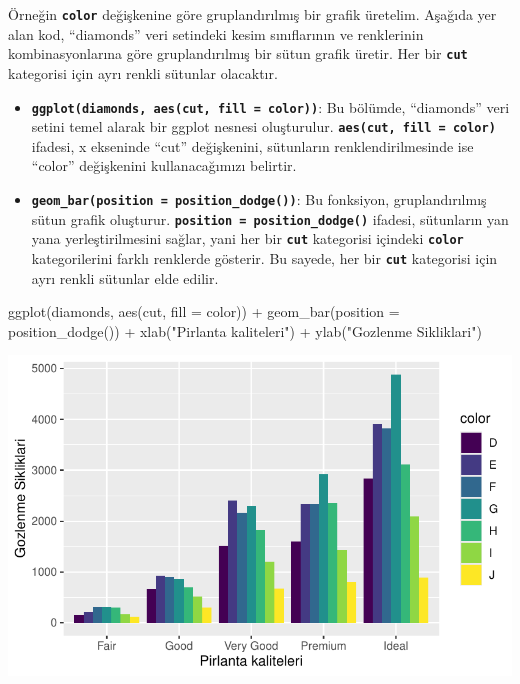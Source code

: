 \documentclass[
  letterpaper,
  DIV=11,
  numbers=noendperiod]{scrreprt}
\newenvironment{Shaded}{\begin{snugshade}}{\end{snugshade}}
\newcommand{\AttributeTok}[1]{\textcolor[rgb]{0.40,0.45,0.13}{#1}}
\newcommand{\FunctionTok}[1]{\textcolor[rgb]{0.28,0.35,0.67}{#1}}
\newcommand{\NormalTok}[1]{\textcolor[rgb]{0.00,0.23,0.31}{#1}}
\newcommand{\SpecialCharTok}[1]{\textcolor[rgb]{0.37,0.37,0.37}{#1}}
\newcommand{\StringTok}[1]{\textcolor[rgb]{0.13,0.47,0.30}{#1}}
\begin{document}
Örneğin \textbf{\texttt{color}} değişkenine göre gruplandırılmış bir
grafik üretelim. Aşağıda yer alan kod, ``diamonds'' veri setindeki kesim
sınıflarının ve renklerinin kombinasyonlarına göre gruplandırılmış bir
sütun grafik üretir. Her bir \textbf{\texttt{cut}} kategorisi için ayrı
renkli sütunlar olacaktır.

\begin{itemize}
\item
  \textbf{\texttt{ggplot(diamonds,\ aes(cut,\ fill\ =\ color))}}: Bu
  bölümde, ``diamonds'' veri setini temel alarak bir ggplot nesnesi
  oluşturulur. \textbf{\texttt{aes(cut,\ fill\ =\ color)}} ifadesi, x
  ekseninde ``cut'' değişkenini, sütunların renklendirilmesinde ise
  ``color'' değişkenini kullanacağımızı belirtir.
\item
  \textbf{\texttt{geom\_bar(position\ =\ position\_dodge())}}: Bu
  fonksiyon, gruplandırılmış sütun grafik oluşturur.
  \textbf{\texttt{position\ =\ position\_dodge()}} ifadesi, sütunların
  yan yana yerleştirilmesini sağlar, yani her bir \textbf{\texttt{cut}}
  kategorisi içindeki \textbf{\texttt{color}} kategorilerini farklı
  renklerde gösterir. Bu sayede, her bir \textbf{\texttt{cut}}
  kategorisi için ayrı renkli sütunlar elde edilir.
\end{itemize}

\begin{Shaded}
\begin{Highlighting}[]
\FunctionTok{ggplot}\NormalTok{(diamonds, }\FunctionTok{aes}\NormalTok{(cut, }\AttributeTok{fill =}\NormalTok{ color)) }\SpecialCharTok{+}
  \FunctionTok{geom\_bar}\NormalTok{(}\AttributeTok{position =} \FunctionTok{position\_dodge}\NormalTok{()) }\SpecialCharTok{+} 
  \FunctionTok{xlab}\NormalTok{(}\StringTok{"Pirlanta kaliteleri"}\NormalTok{) }\SpecialCharTok{+} 
  \FunctionTok{ylab}\NormalTok{(}\StringTok{"Gozlenme Sikliklari"}\NormalTok{)}
\end{Highlighting}
\end{Shaded}

\includegraphics{ggplot2_files/figure-pdf/unnamed-chunk-16-1.pdf}
\end{document}
